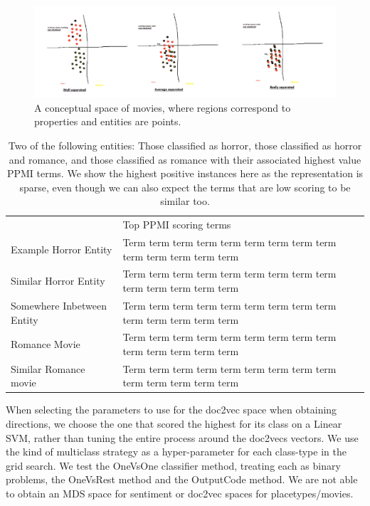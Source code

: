\begin{figure}[t]
	\includegraphics[width=\textwidth]{images/genres_separated.png}
	\centering
	\caption{A conceptual space of movies, where regions correspond to properties and entities are points.}\label{figure:genres_separated}
\end{figure}

\begin{table}[]
	\begin{tabular}{ll}
		& Top PPMI scoring terms                                                \\
		Example Horror Entity      & Term term term term term term term term term term term term term term \\
		Similar Horror Entity      & Term term term term term term term term term term term term term term \\
		Somewhere Inbetween Entity & Term term term term term term term term term term term term term term \\
		Romance Movie              & Term term term term term term term term term term term term term term \\
		Similar Romance movie      & Term term term term term term term term term term term term term term
	\end{tabular}
\caption{Two of the following entities: Those classified as horror, those classified as horror and romance, and those classified as romance with their associated highest value PPMI terms. We show the highest positive instances here as the representation is sparse, even though we can also expect the terms that are low scoring to be similar too.}
\label{table:PPMI_example}
\end{table}

When selecting the parameters to use for the doc2vec space when obtaining directions, we choose the one that scored the highest for its class on a Linear SVM, rather than tuning the entire process around the doc2vecs vectors.
We use the kind of multiclass strategy as a hyper-parameter for each class-type in the grid search. We test the OneVsOne classifier method, treating each as binary problems, the OneVsRest method and the OutputCode method.
We are not able to obtain an MDS space for sentiment or doc2vec spaces for placetypes/movies.

